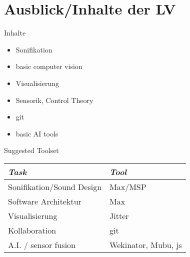 \section{Ausblick/Inhalte der LV}
 \frame{\sectionpage}

 \begin{frame}{Inhalte}
 	\begin{itemize}
 		\item Sonifikation
 		\item basic computer vision
	 	\item Visualisierung
	 	\item Sensorik, Control Theory
	 	\item git
	 	\item basic AI tools
 	\end{itemize}
 \end{frame}


 \begin{frame}{Suggested Toolset}

\begin{table}[]
\begin{tabular}{l|l}
\emph{Task} 			  & \emph{Tool}			\\ \hline             
Sonifikation/Sound Design & Max/MSP             \\
Software Architektur      & Max                 \\
Visualisierung            & Jitter              \\
Kollaboration             & git                 \\
A.I. / sensor fusion      & Wekinator, Mubu, js
\end{tabular}
\end{table}

 \end{frame}
